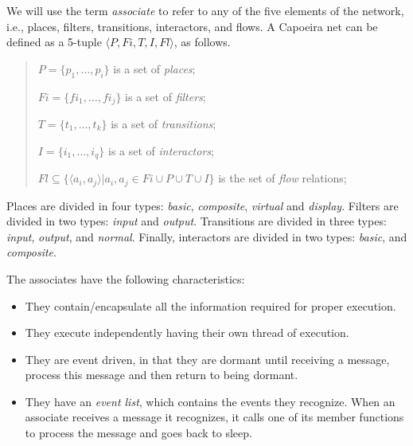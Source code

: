 \documentclass[twocolumn,10pt]{article}
\begin{document}
We will use the term {\em associate} to refer to any of the five
elements of the network, i.e., places, filters, transitions,
interactors, and flows.
A Capoeira net can be defined as a 5-tuple $\langle P, Fi, T, I, Fl
\rangle$, as follows.

\begin{quote}

$P = \{p_1, \ldots, p_i\}$ is a set of {\em places};

$Fi = \{fi_1, \ldots, fi_j\}$ is a set of {\em filters};

$T = \{t_{1}, \ldots, t_{k}\}$ is a set of {\em transitions}; 

$I = \{i_1, \ldots, i_q\}$ is a set of {\em interactors};

$Fl \subseteq \{\langle a_i,a_j\rangle | a_i, a_j \in Fi \cup P \cup
T \cup I\}$ is the set of {\em flow} relations;

\end{quote}

Places are divided in four types: {\em basic}, {\em composite}, {\em
  virtual} and {\em display}.  Filters are divided in two types: {\em
  input} and {\em output}.  Transitions are divided in three types:
{\em input}, {\em output}, and {\em normal}.  Finally, interactors are
divided in two types: {\em basic}, and {\em composite}.

The associates have the following characteristics: 

\begin{itemize}

\item They contain/encapsulate all the information required for proper
  execution.
\item They execute independently having their own thread of execution.
\item They are event driven, in that they are dormant until receiving a
  message, process this message and then return to being dormant.
\item They have an {\em event list}, which contains the events
  they recognize.  When an associate receives a message it recognizes,
  it calls one of its member functions to process the message
  and goes back to sleep.

\end{itemize}


%
%
\end{document}
